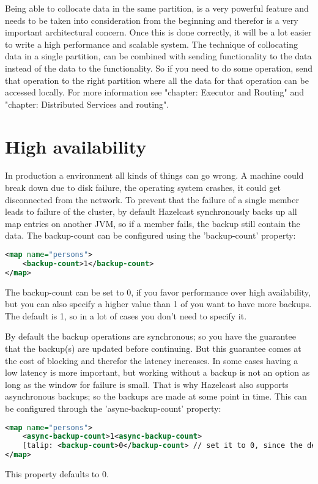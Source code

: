 Being able to collocate data in the same partition, is a very powerful feature and needs to be taken into consideration from the beginning and therefor is a very important architectural concern. Once this is done correctly, it will be a lot easier to write a high performance and scalable system. The technique of collocating data in a single partition, can be combined with sending functionality to the data instead of the data to the functionality. So if you need to do some operation, send that operation to the right partition where all the data for that operation can be accessed locally. For more information see "chapter: Executor and Routing" and "chapter: Distributed Services and routing".

\section{High availability}
In production a environment all kinds of things can go wrong. A machine could break down due to disk failure, the operating system crashes, it could get disconnected from the network. To prevent that the failure of a single member leads to failure of the cluster, by default Hazelcast synchronously backs up all map entries on another JVM, so if a member fails, the backup still contain the data. The backup-count can be configured using the 'backup-count' property:
\begin{lstlisting}[language=xml]
<map name="persons"> 
    <backup-count>1</backup-count>
</map> 
\end{lstlisting}
The backup-count can be set to 0, if you favor performance over high availability, but you can also specify a higher value than 1 of you want to have more backups. The default is 1, so in a lot of cases you don't need to specify it.

By default the backup operations are synchronous; so you have the guarantee that the backup(s) are updated before continuing. But this guarantee comes at the cost of blocking and therefor the latency increases. In some cases having a low latency is more important, but working without a backup is not an option as long as the window for failure is small. That is why Hazelcast also supports asynchronous backups; so the backups are made at some point in time. This can be configured through the 'async-backup-count' property:
\begin{lstlisting}[language=xml]
<map name="persons"> 
    <async-backup-count>1<async-backup-count>
    [talip: <backup-count>0</backup-count> // set it to 0, since the default is 1 ]
</map> 
\end{lstlisting}
This property defaults to 0. 

